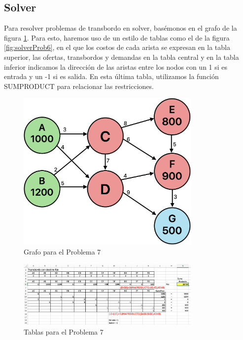 \documentclass[12pt]{article}  %
\begin{document}
\subsection{Solver}
Para resolver problemas de transbordo en solver, basémonos en el grafo de la figura \ref{fig:grafoProb7}. Para esto, haremos uso de un estilo de tablas como el de la figura \ref{fig:solverProb6}, en el que los costos de cada arista se expresan en la tabla superior, las ofertas, transbordos y demandas en la tabla central y en la tabla inferior indicamos la dirección de las aristas entre los nodos con un 1 si es entrada y un -1 si es salida. En esta última tabla, utilizamos la función SUMPRODUCT para relacionar las restricciones.

\begin{figure}[H]
\centering
\caption{Grafo para el Problema 7}
\label{fig:grafoProb7}
\includegraphics[width=0.8\textwidth]{assets/grafoProb7.png}
\end{figure}

\begin{figure}[H]
\centering
\caption{Tablas para el Problema 7}
\label{fig:tablasolverProb7}
\includegraphics[width=0.8\textwidth]{assets/tablasolverProb7.png}
\end{figure}
\end{document}
